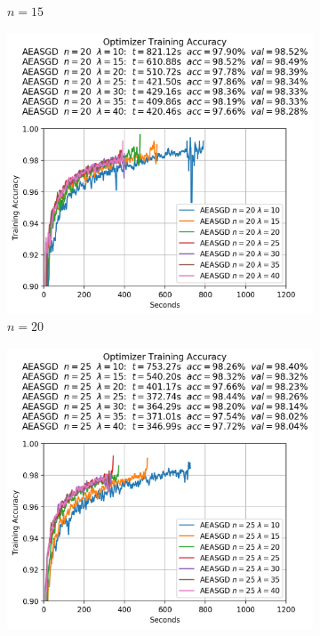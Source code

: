 \begin{figure}
\begin{subfigure}{.3\textwidth}
    \caption{$n = 15$}
  \end{subfigure}
  \begin{subfigure}{.3\textwidth}
    \centering
    \includegraphics[width=\linewidth]{resources/images/aeasgd_experiments_workers_20}
    \caption{$n = 20$}
  \end{subfigure}
  \begin{subfigure}{.3\textwidth}
    \centering
    \includegraphics[width=\linewidth]{resources/images/aeasgd_experiments_workers_25}

\end{subfigure}
\end{figure}
